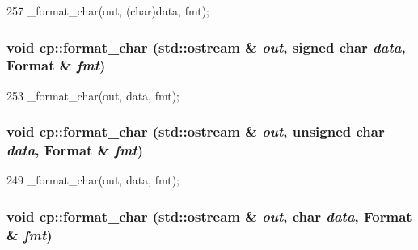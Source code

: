 \begin{DoxyCode}
257 { _format_char(out, (char)data, fmt); }
\end{DoxyCode}
\hypertarget{namespacecp_acc4c174685064092b17978375387358a}{
\subsubsection[{format\_\-char}]{\setlength{\rightskip}{0pt plus 5cm}void cp::format\_\-char (std::ostream \& {\em out}, \/  signed char {\em data}, \/  Format \& {\em fmt})}}
\label{namespacecp_acc4c174685064092b17978375387358a}



\begin{DoxyCode}
253 { _format_char(out, data, fmt); }
\end{DoxyCode}
\hypertarget{namespacecp_aa4f0b57ce9dab1bd82680699afbb9fec}{
\subsubsection[{format\_\-char}]{\setlength{\rightskip}{0pt plus 5cm}void cp::format\_\-char (std::ostream \& {\em out}, \/  unsigned char {\em data}, \/  Format \& {\em fmt})}}
\label{namespacecp_aa4f0b57ce9dab1bd82680699afbb9fec}



\begin{DoxyCode}
249 { _format_char(out, data, fmt); }
\end{DoxyCode}
\hypertarget{namespacecp_aae138ed98d6c597a9af56b153e268eae}{
\subsubsection[{format\_\-char}]{\setlength{\rightskip}{0pt plus 5cm}void cp::format\_\-char (std::ostream \& {\em out}, \/  char {\em data}, \/  Format \& {\em fmt})}}
\label{namespacecp_aae138ed98d6c597a9af56b153e268eae}



